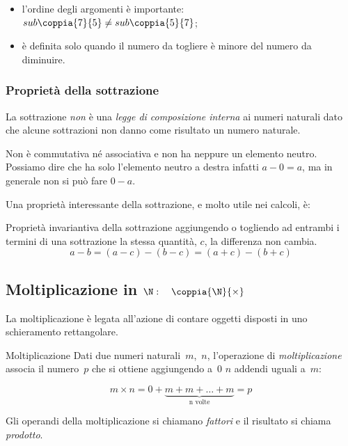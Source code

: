 \begin{osservazioni}{}{}
\begin{itemize} [nosep]
\item l'ordine degli argomenti è importante: 
\(sub \coppia{7}{5} \neq sub \coppia{5}{7}\);
\item è definita solo quando il numero da togliere è 
minore del numero da diminuire.
\end{itemize}
\end{osservazioni}

\subsubsection{Proprietà della sottrazione}

La sottrazione \emph{non} è una \emph{legge di composizione interna} ai 
numeri naturali dato che alcune sottrazioni non danno come risultato un 
numero naturale.

Non è commutativa né associativa e non ha neppure un elemento neutro.
Possiamo dire che ha solo l'elemento neutro a destra infatti \(a - 0 = a\), 
ma in generale non si può fare \(0 - a\).

Una proprietà interessante della sottrazione, e molto utile nei calcoli, è:

\begin{definizione}{Proprietà invariantiva della sottrazione}{}
aggiungendo o togliendo ad entrambi i termini 
di una sottrazione la stessa quantità, \(c\), 
la differenza non cambia.
\[a - b = (a - c) - (b - c) = (a + c) - (b + c)\]
\end{definizione}

\subsection{Moltiplicazione in $\N: \quad \coppia{\N}{\times}$}

La moltiplicazione è legata all'azione di contare oggetti disposti in uno
schieramento rettangolare.

\begin{definizione}{Moltiplicazione}{}
Dati due numeri naturali~\(m\),~\(n\), l'operazione di \emph{moltiplicazione} 
associa il numero~\(p\) che si ottiene aggiungendo a~0 \(n\) addendi 
uguali a~\(m\):

\begin{inaccessibleblock}
\[m \times n = 0 + \underbrace{m + m + \dots + m}_{\text{n volte}} = p\]
\end{inaccessibleblock}

Gli operandi della moltiplicazione si chiamano \emph{fattori} e il 
risultato si chiama \emph{prodotto}.
\end{definizione}


